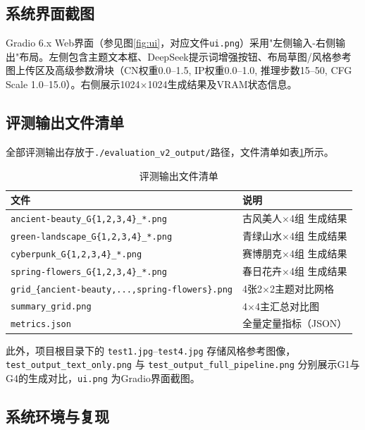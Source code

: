\documentclass[12pt,a4paper]{ctexart}
\begin{document}
\subsection{系统界面截图}

Gradio 6.x Web界面（参见图\ref{fig:ui}，对应文件\texttt{ui.png}）采用"左侧输入-右侧输出"布局。左侧包含主题文本框、DeepSeek提示词增强按钮、布局草图/风格参考图上传区及高级参数滑块（CN权重0.0--1.5, IP权重0.0--1.0, 推理步数15--50, CFG Scale 1.0--15.0）。右侧展示1024$\times$1024生成结果及VRAM状态信息。

\subsection{评测输出文件清单}

全部评测输出存放于\texttt{./evaluation\_v2\_output/}路径，文件清单如表\ref{tab:output-files}所示。

\begin{table}[H]
\centering
\caption{评测输出文件清单}
\label{tab:output-files}
\begin{tabular}{@{}ll@{}}
\toprule
\rowcolor{tabhead}
\color{white}\textbf{文件} & \color{white}\textbf{说明} \\
\midrule
\texttt{ancient-beauty\_G\{1,2,3,4\}\_*.png} & 古风美人$\times$4组 生成结果 \\
\texttt{green-landscape\_G\{1,2,3,4\}\_*.png} & 青绿山水$\times$4组 生成结果 \\
\texttt{cyberpunk\_G\{1,2,3,4\}\_*.png} & 赛博朋克$\times$4组 生成结果 \\
\texttt{spring-flowers\_G\{1,2,3,4\}\_*.png} & 春日花卉$\times$4组 生成结果 \\
\texttt{grid\_\{ancient-beauty,...,spring-flowers\}.png} & 4张2$\times$2主题对比网格 \\
\texttt{summary\_grid.png} & 4$\times$4主汇总对比图 \\
\texttt{metrics.json} & 全量定量指标（JSON） \\
\bottomrule
\end{tabular}
\end{table}

此外，项目根目录下的 \texttt{test1.jpg}--\texttt{test4.jpg} 存储风格参考图像，\texttt{test\_output\_text\_only.png} 与 \texttt{test\_output\_full\_pipeline.png} 分别展示G1与G4的生成对比，\texttt{ui.png} 为Gradio界面截图。

\subsection{系统环境与复现}
\end{document}
